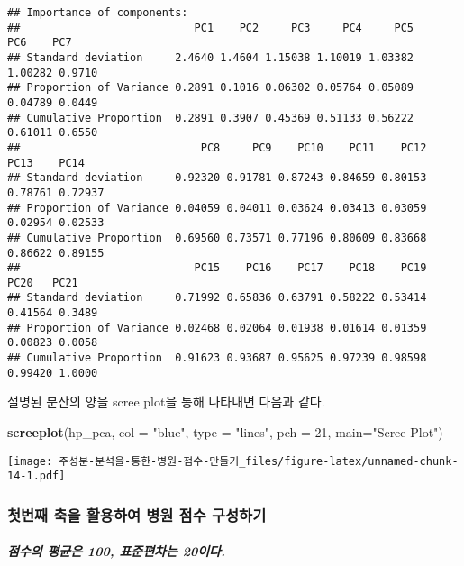 \documentclass[
]{article}
\newenvironment{Shaded}{\begin{snugshade}}{\end{snugshade}}
\newcommand{\DataTypeTok}[1]{\textcolor[rgb]{0.13,0.29,0.53}{#1}}
\newcommand{\DecValTok}[1]{\textcolor[rgb]{0.00,0.00,0.81}{#1}}
\newcommand{\KeywordTok}[1]{\textcolor[rgb]{0.13,0.29,0.53}{\textbf{#1}}}
\newcommand{\NormalTok}[1]{#1}
\newcommand{\StringTok}[1]{\textcolor[rgb]{0.31,0.60,0.02}{#1}}
\begin{document}
\begin{verbatim}
## Importance of components:
##                           PC1    PC2     PC3     PC4     PC5     PC6    PC7
## Standard deviation     2.4640 1.4604 1.15038 1.10019 1.03382 1.00282 0.9710
## Proportion of Variance 0.2891 0.1016 0.06302 0.05764 0.05089 0.04789 0.0449
## Cumulative Proportion  0.2891 0.3907 0.45369 0.51133 0.56222 0.61011 0.6550
##                            PC8     PC9    PC10    PC11    PC12    PC13    PC14
## Standard deviation     0.92320 0.91781 0.87243 0.84659 0.80153 0.78761 0.72937
## Proportion of Variance 0.04059 0.04011 0.03624 0.03413 0.03059 0.02954 0.02533
## Cumulative Proportion  0.69560 0.73571 0.77196 0.80609 0.83668 0.86622 0.89155
##                           PC15    PC16    PC17    PC18    PC19    PC20   PC21
## Standard deviation     0.71992 0.65836 0.63791 0.58222 0.53414 0.41564 0.3489
## Proportion of Variance 0.02468 0.02064 0.01938 0.01614 0.01359 0.00823 0.0058
## Cumulative Proportion  0.91623 0.93687 0.95625 0.97239 0.98598 0.99420 1.0000
\end{verbatim}

설명된 분산의 양을 scree plot을 통해 나타내면 다음과 같다.

\begin{Shaded}
\begin{Highlighting}[]
\KeywordTok{screeplot}\NormalTok{(hp_pca, }\DataTypeTok{col =} \StringTok{"blue"}\NormalTok{, }\DataTypeTok{type =} \StringTok{"lines"}\NormalTok{, }\DataTypeTok{pch =} \DecValTok{21}\NormalTok{, }\DataTypeTok{main=}\StringTok{"Scree Plot"}\NormalTok{)}
\end{Highlighting}
\end{Shaded}

\texttt{[image: 주성분-분석을-통한-병원-점수-만들기\_files/figure-latex/unnamed-chunk-14-1.pdf]}

\hypertarget{uxccabuxbc88uxc9f8-uxcd95uxc744-uxd65cuxc6a9uxd558uxc5ec-uxbcd1uxc6d0-uxc810uxc218-uxad6cuxc131uxd558uxae30}{%
\subsubsection{첫번째 축을 활용하여 병원 점수
구성하기}\label{uxccabuxbc88uxc9f8-uxcd95uxc744-uxd65cuxc6a9uxd558uxc5ec-uxbcd1uxc6d0-uxc810uxc218-uxad6cuxc131uxd558uxae30}}

\hypertarget{uxc810uxc218uxc758-uxd3c9uxade0uxc740-100-uxd45cuxc900uxd3b8uxcc28uxb294-20uxc774uxb2e4.}{%
\subparagraph{점수의 평균은 100, 표준편차는
20이다.}\label{uxc810uxc218uxc758-uxd3c9uxade0uxc740-100-uxd45cuxc900uxd3b8uxcc28uxb294-20uxc774uxb2e4.}}
\end{document}
